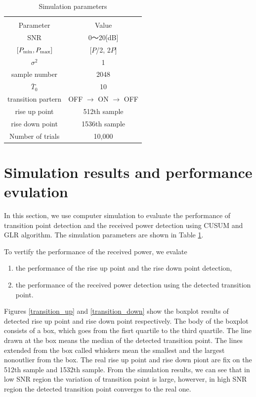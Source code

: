 \begin{table}[t]
\begin{center}
 \caption{\normalsize{Simulation parameters}}
 
\normalsize

  \begin{tabular}{c|c}
    & \\
    Parameter &Value \\ \hline
    SNR & 0〜20[dB] \\
    $[P_{{\rm min}},P_{{\rm max}}]$ & [$P$/2, 2$P$] \\
    $\sigma^2$ & 1 \\
    sample number & 2048 \\
    $\bar{T}_0$ & 10 \\
    transition partern & OFF $\rightarrow$ ON $\rightarrow$ OFF \\
    rise up point & 512th sample\\
    rise down point & 1536th sample\\
    Number of trials & 10,000 \\ \hline
  \end{tabular}
\label{parameter}
\end{center}
\end{table}
\section{Simulation results and performance evulation}
In this section, we use computer simulation to evaluate the performance of transition point detection and the received power detection using CUSUM and GLR algorithm. The simulation parameters are shown in Table \ref{parameter}.

To vertify the performance of the received power, we evalate

\begin{enumerate}
\item the performance of the rise up point and the rise down point detection, 
\item the performance of the received power detection using the detected transition point.
\end{enumerate}
Figures \ref{transition_up} and \ref{transition_down} show the boxplot results of detected rise up point and rise down point respectively. The body of the boxplot consists of a box, which goes from the fisrt quartile to the third quartile. The line drawn at the box means the median of the detected transition point. The lines extended from the box called whiskers mean the smallest and the largest nonoutlier from the box. The real rise up point and rise down piont are fix on the 512th sample and 1532th sample. From the simulation results, we can see that in low SNR region the variation of transition point is large, howerver, in high SNR region the detected transition point converges to the real one.

